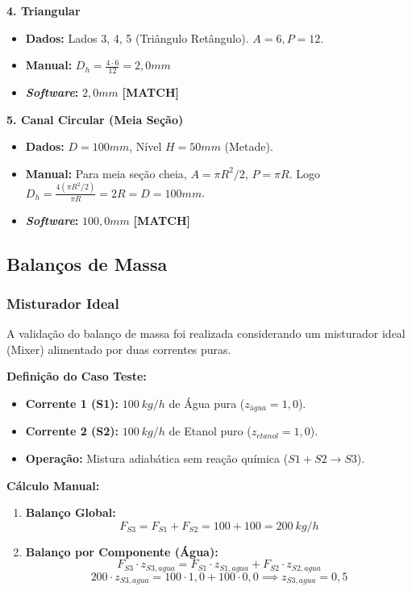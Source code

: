 \textbf{4. Triangular}
\begin{itemize}
    \item \textbf{Dados:} Lados 3, 4, 5 (Triângulo Retângulo). $A=6, P=12$.
    \item \textbf{Manual:} $D_h = \frac{4 \cdot 6}{12} = 2,0mm$
    \item \textbf{\textit{Software}:} $2,0mm$ \textbf{[MATCH]}
\end{itemize}

\textbf{5. Canal Circular (Meia Seção)}
\begin{itemize}
    \item \textbf{Dados:} $D=100mm$, Nível $H=50mm$ (Metade).
    \item \textbf{Manual:} Para meia seção cheia, $A = \pi R^2 / 2$, $P = \pi R$. Logo $D_h = \frac{4 (\pi R^2/2)}{\pi R} = 2R = D = 100mm$.
    \item \textbf{\textit{Software}:} $100,0mm$ \textbf{[MATCH]}
\end{itemize}

\subsection{Balanços de Massa}
\subsubsection{Misturador Ideal}

A validação do balanço de massa foi realizada considerando um misturador ideal (Mixer) alimentado por duas correntes puras.

\textbf{Definição do Caso Teste:}
\begin{itemize}
    \item \textbf{Corrente 1 (S1):} $100 \ kg/h$ de Água pura ($z_{água}=1,0$).
    \item \textbf{Corrente 2 (S2):} $100 \ kg/h$ de Etanol puro ($z_{etanol}=1,0$).
    \item \textbf{Operação:} Mistura adiabática sem reação química ($S1 + S2 \to S3$).
\end{itemize}

\textbf{Cálculo Manual:}
\begin{enumerate}
    \item \textbf{Balanço Global:}
    \begin{equation}
        F_{S3} = F_{S1} + F_{S2} = 100 + 100 = 200 \ kg/h
    \end{equation}
    
    \item \textbf{Balanço por Componente (Água):}
    \begin{equation}
        F_{S3} \cdot z_{S3,agua} = F_{S1} \cdot z_{S1,agua} + F_{S2} \cdot z_{S2,agua}
    \end{equation}
    \begin{equation}
        200 \cdot z_{S3,agua} = 100 \cdot 1,0 + 100 \cdot 0,0 \implies z_{S3,agua} = 0,5
    \end{equation}
\end{enumerate}

